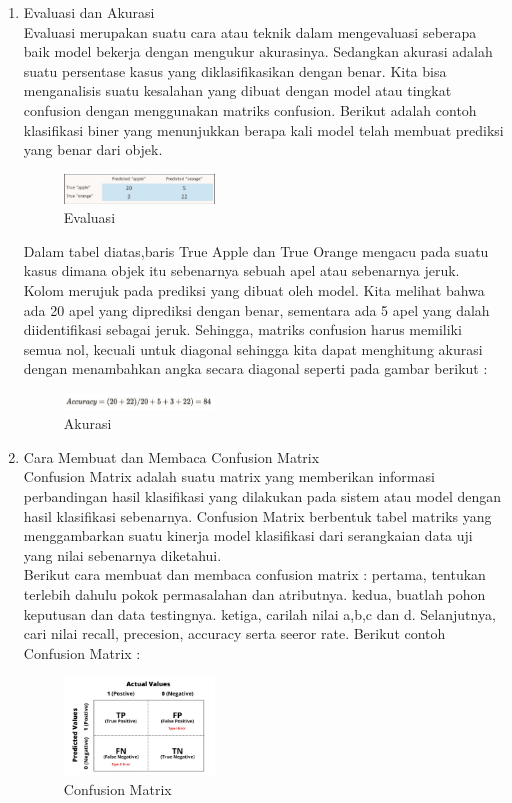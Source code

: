 \begin{enumerate}
\item Evaluasi dan Akurasi \\
Evaluasi merupakan suatu cara atau teknik dalam mengevaluasi seberapa baik model bekerja dengan mengukur akurasinya. Sedangkan akurasi adalah suatu persentase kasus yang diklasifikasikan dengan benar. Kita bisa menganalisis suatu kesalahan yang dibuat dengan model atau tingkat confusion dengan menggunakan matriks confusion. Berikut adalah contoh klasifikasi biner yang menunjukkan berapa kali model telah membuat prediksi yang benar dari objek.
\begin{figure}[H]
		\includegraphics[width=4cm]{figures/1174073/2/evaluasi.png}
		\centering
		\caption{Evaluasi}
\end{figure}
Dalam tabel diatas,baris True Apple dan True Orange mengacu pada suatu kasus dimana objek itu sebenarnya sebuah apel atau sebenarnya jeruk. Kolom merujuk pada prediksi yang dibuat oleh model. Kita melihat bahwa ada 20 apel yang diprediksi dengan benar, sementara ada 5 apel yang dalah diidentifikasi sebagai jeruk. Sehingga, matriks confusion harus memiliki semua nol, kecuali untuk diagonal sehingga kita dapat menghitung akurasi dengan menambahkan angka secara diagonal seperti pada gambar berikut :
\begin{figure}[H]
		\includegraphics[width=4cm]{figures/1174073/2/akurasi.png}
		\centering
		\caption{Akurasi}
\end{figure}

\item Cara Membuat dan Membaca Confusion Matrix \\
Confusion Matrix adalah suatu matrix yang memberikan informasi perbandingan hasil klasifikasi yang dilakukan pada sistem atau model dengan hasil klasifikasi sebenarnya. Confusion Matrix berbentuk tabel matriks yang menggambarkan suatu kinerja model klasifikasi dari serangkaian data uji yang nilai sebenarnya diketahui. \\
Berikut cara membuat dan membaca confusion matrix : pertama, tentukan terlebih dahulu pokok permasalahan dan atributnya. kedua, buatlah pohon keputusan dan data testingnya. ketiga, carilah nilai a,b,c dan d. Selanjutnya, cari nilai recall, precesion, accuracy serta seeror rate. Berikut contoh Confusion Matrix :
\begin{figure}[H]
		\includegraphics[width=4cm]{figures/1174073/2/confusion.jpeg}
		\centering
		\caption{Confusion Matrix}
\end{figure}


\end{enumerate}
